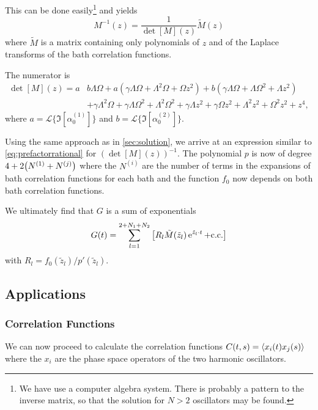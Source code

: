 This can be done easily\footnote{We have use a computer algebra
  system. There is probably a pattern to the inverse matrix, so that
  the solution for \(N>2\) oscillators may be found.}  and yields
\begin{equation}
  \label{eq:minvtwo}
  M^{-1}(z) = \frac{1}{\det[M](z)} \tilde{M}(z)
 \end{equation}
where \(\tilde{M}\) is a matrix containing only polynomials of \(z\)
and of the Laplace transforms of the bath correlation functions.

The numerator is
\begin{equation}
  \label{eq:numerator}
  \begin{aligned}
  \det[M](z)=a& b \Lambda  \Omega +a \left(\gamma
    \Lambda  \Omega +\Lambda ^2 \Omega +\Omega  z^2\right)
  +b
  \left(\gamma \Lambda  \Omega +\Lambda  \Omega ^2+\Lambda  z^2\right)\\
  &+\gamma  \Lambda ^2 \Omega +\gamma  \Lambda
   \Omega ^2+\Lambda ^2 \Omega ^2+\gamma  \Lambda  z^2+\gamma  \Omega  z^2+\Lambda ^2 z^2+\Omega ^2 z^2+z^4,
  \end{aligned}
\end{equation}
where \(a=\mathcal{L}\{\Im[α^{(1)}_0]\}\) and \(b=\mathcal{L}\{\Im[α^{(2)}_0]\}\).

Using the same approach as in \cref{sec:solution}, we arrive at an
expression similar to \cref{eq:prefactorrational} for
\((\det[M](z))^{-1}\). The polynomial \(p\) is now of degree
\(4 + 2 \qty(N^{(1)} + N^{(j)})\) where the \(N^{(i)}\) are the number of
terms in the expansions of bath correlation functions for each bath
and the function \(f_0\) now depends on both bath correlation
functions.

We ultimately find that \(G\) is a sum of
exponentials
\begin{equation}
  \label{eq:gfinal}
  G(t) = \sum_{l=1}^{2+N_1+N_2}\qty[R_l \tilde{M}(\tilde{z}_l)\operatorname{e}^{\tilde{z}_l \cdot
    t} + \mathrm{c.c.}]
\end{equation}
with \(R_l={f_0(\tilde{z}_l)}/{p'(\tilde{z}_l)}\).

\subsection{Applications}
\subsubsection{Correlation Functions}
\label{sec:correltwo}

We can now proceed to calculate the correlation functions
\(C(t,s) = \ev{x_i(t)x_j(s)}\) where the \(x_i\) are the phase space operators
of the two harmonic oscillators.

